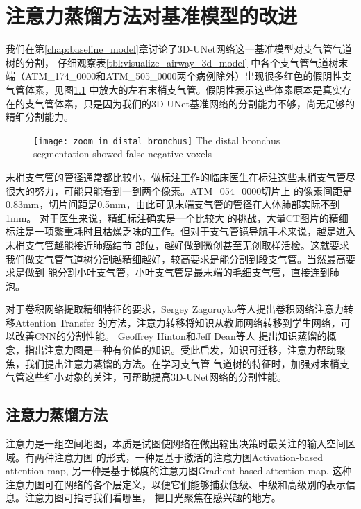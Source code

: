 
\chapter{注意力蒸馏方法对基准模型的改进}

我们在第\ref{chap:baseline_model}章讨论了3D-UNet网络这一基准模型对支气管气道树的分割， 仔细观察表\ref{tbl:visualize_airway_3d_model}
中各个支气管气道树末端（ATM\_174\_0000和ATM\_505\_0000两个病例除外）出现很多红色的假阴性支气管体素，见图\ref{fig:distal_bronchus}
中放大的左右末梢支气管。假阴性表示这些体素原本是真实存在的支气管体素，只是因为我们的3D-UNet基准网络的分割能力不够，尚无足够的精细分割能力。
\begin{figure}[!htp]
    \centering
    \texttt{[image: zoom\_in\_distal\_bronchus]}
        {The distal bronchus segmentation showed false-negative voxels}
    \label{fig:distal_bronchus}
\end{figure}
末梢支气管的管径通常都比较小，做标注工作的临床医生在标注这些末梢支气管尽很大的努力，可能只能看到一到两个像素。ATM\_054\_0000切片上
的像素间距是0.83mm，切片间距是0.5mm，由此可见末端支气管的管径在人体肺部实际不到1mm。 对于医生来说，精细标注确实是一个比较大
的挑战，大量CT图片的精细标注是一项繁重耗时且枯燥乏味的工作。但对于支气管镜导航手术来说，越是进入末梢支气管越能接近肺癌结节
部位，越好做到微创甚至无创取样活检。这就要求我们做支气管气道树分割越精细越好，较高要求是能分割到段支气管。当然最高要求是做到
能分割小叶支气管，小叶支气管是最末端的毛细支气管，直接连到肺泡。

对于卷积网络提取精细特征的要求，Sergey Zagoruyko等人\cite{Zagoruyko2016PayingMA}提出卷积网络注意力转移Attention Transfer
的方法，注意力转移将知识从教师网络转移到学生网络，可以改善CNN的分割性能。 Geoffrey Hinton和Jeff Dean等人\cite{Hinton2015DistillingTK}
提出知识蒸馏的概念，指出注意力图是一种有价值的知识。受此启发，知识可迁移，注意力帮助聚焦，我们提出注意力蒸馏的方法。在学习支气管
气道树的特征时，加强对末梢支气管这些细小对象的关注，可帮助提高3D-UNet网络的分割性能。

\section{注意力蒸馏方法}

注意力是一组空间地图，本质是试图使网络在做出输出决策时最关注的输入空间区域\cite{Zagoruyko2016PayingMA}。有两种注意力图
的形式，一种是基于激活的注意力图Activation-based attention map, 另一种是基于梯度的注意力图Gradient-based 
attention map. 这种注意力图可在网络的各个层定义，以便它们能够捕获低级、中级和高级别的表示信息。注意力图可指导我们看哪里，
把目光聚焦在感兴趣的地方。 

